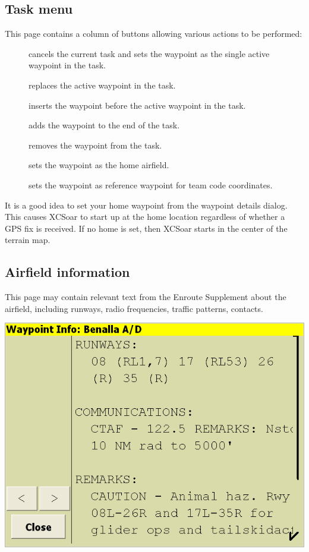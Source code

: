 \documentclass[a4paper,12pt]{refrep}
\begin{document}
\subsection*{Task menu}  
This page contains a column of buttons allowing various actions to be performed:
\begin{description}
\item[] cancels the current task and sets the waypoint as the
  single active waypoint in the task.
\item[] replaces the active waypoint in the task.
\item[] inserts the waypoint before the active waypoint in
  the task.
\item[] adds the waypoint to the end of the task.
\item[] removes the waypoint from the task.
\item[] sets the waypoint as the home airfield.
\item[] sets the waypoint as reference waypoint for
  team code coordinates.

\end{description}

It is a good idea to set your home waypoint from the waypoint details
dialog. This causes XCSoar to start up at the home location regardless
of whether a GPS fix is received.  If no home is set, then XCSoar
starts in the center of the terrain map.

\subsection*{Airfield information}
This page may contain relevant text from the Enroute Supplement about
the airfield, including runways, radio frequencies, traffic patterns,
contacts.
\begin{center}
\includegraphics[angle=0,width=\linewidth,keepaspectratio='true']{figures/dialog-waypointdetails1.png}
\end{center}
\end{document}
